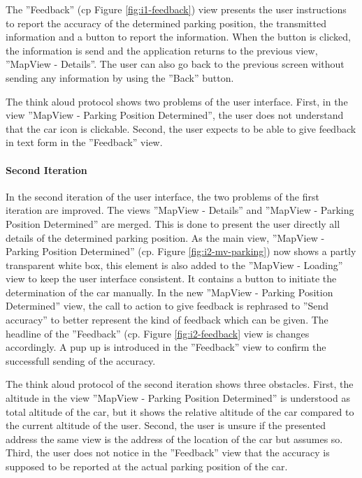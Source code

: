 The ''Feedback'' (cp Figure \ref{fig:i1-feedback}) view presents the user instructions to report the accuracy of the determined parking position, the transmitted information and a button to report the information. When the button is clicked, the information is send and the application returns to the previous view, ''MapView - Details''. The user can also go back to the previous screen without sending any information by using the ''Back'' button.


The think aloud protocol shows two problems of the user interface. First, in the view ''MapView - Parking Position Determined'', the user does not understand that the car icon is clickable. Second, the user expects to be able to give feedback in text form in the ''Feedback'' view.

\paragraph{Second Iteration}

In the second iteration of the user interface, the two problems of the first iteration are improved. The views ''MapView - Details'' and ''MapView - Parking Position Determined'' are merged. This is done to present the user directly all details of the determined parking position. 
As the main view, ''MapView - Parking Position Determined'' (cp. Figure \ref{fig:i2-mv-parking}) now shows a partly transparent white box, this element is also added to the ''MapView - Loading'' view to keep the user interface consistent. It contains a button to initiate the determination of the car manually. 
In the new ''MapView - Parking Position Determined'' view, the call to action to give feedback is rephrased to ''Send accuracy'' to better represent the kind of feedback which can be given. The headline of the ''Feedback'' (cp. Figure \ref{fig:i2-feedback} view is changes accordingly. A pup up is introduced in the ''Feedback'' view to confirm the successfull sending of the accuracy.

The think aloud protocol of the second iteration shows three obstacles. First, the altitude in the view ''MapView - Parking Position Determined'' is understood as total altitude of the car, but it shows the relative altitude of the car compared to the current altitude of the user. Second, the user is unsure if the presented address the same view is the address of the location of the car but assumes so. Third, the user does not notice in the ''Feedback'' view that the accuracy is supposed to be reported at the actual parking position of the car.


